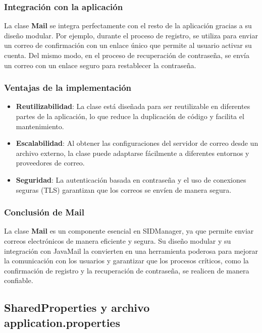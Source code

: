 \documentclass[draft]{scrbook}
\begin{document}
\subsubsection{Integración con la aplicación}

La clase \textbf{Mail} se integra perfectamente con el resto de la aplicación gracias a su diseño modular. Por ejemplo, durante el proceso de registro, se utiliza para enviar un correo de confirmación con un enlace único que permite al usuario activar su cuenta. Del mismo modo, en el proceso de recuperación de contraseña, se envía un correo con un enlace seguro para restablecer la contraseña.

\subsubsection{Ventajas de la implementación}

\begin{itemize}
    \item \textbf{Reutilizabilidad}: La clase está diseñada para ser reutilizable en diferentes partes de la aplicación, lo que reduce la duplicación de código y facilita el mantenimiento.
    
    \item \textbf{Escalabilidad}: Al obtener las configuraciones del servidor de correo desde un archivo externo, la clase puede adaptarse fácilmente a diferentes entornos y proveedores de correo.
    
    \item \textbf{Seguridad}: La autenticación basada en contraseña y el uso de conexiones seguras (TLS) garantizan que los correos se envíen de manera segura.
\end{itemize}

\subsubsection{Conclusión de Mail}

La clase \textbf{Mail} es un componente esencial en SIDManager, ya que permite enviar correos electrónicos de manera eficiente y segura. Su diseño modular y su integración con JavaMail la convierten en una herramienta poderosa para mejorar la comunicación con los usuarios y garantizar que los procesos críticos, como la confirmación de registro y la recuperación de contraseña, se realicen de manera confiable.


\subsection{SharedProperties y archivo application.properties}
\label{subsec:shared-properties}
\end{document}
